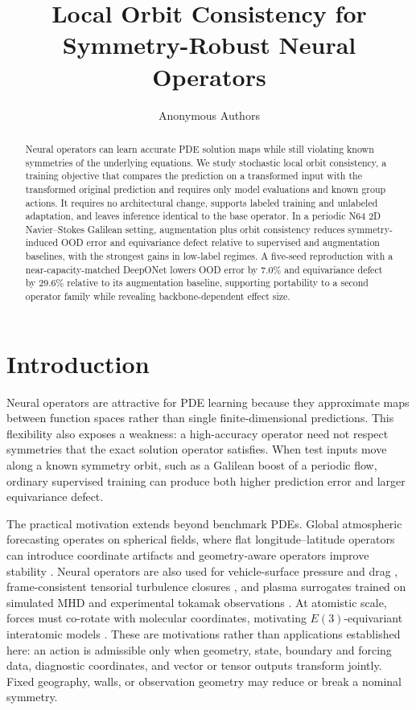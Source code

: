 \documentclass[10pt]{article}
\title{Local Orbit Consistency for Symmetry-Robust Neural Operators}
\author{Anonymous Authors}
\date{}
\begin{document}
\maketitle

\begin{abstract}
Neural operators can learn accurate PDE solution maps while still violating known symmetries of the underlying equations. We study stochastic local orbit consistency, a training objective that compares the prediction on a transformed input with the transformed original prediction and requires only model evaluations and known group actions. It requires no architectural change, supports labeled training and unlabeled adaptation, and leaves inference identical to the base operator. In a periodic N64 2D Navier--Stokes Galilean setting, augmentation plus orbit consistency reduces symmetry-induced OOD error and equivariance defect relative to supervised and augmentation baselines, with the strongest gains in low-label regimes. A five-seed reproduction with a near-capacity-matched DeepONet lowers OOD error by 7.0\% and equivariance defect by 29.6\% relative to its augmentation baseline, supporting portability to a second operator family while revealing backbone-dependent effect size.
\end{abstract}

\section{Introduction}
Neural operators are attractive for PDE learning because they approximate maps between function spaces rather than single finite-dimensional predictions. This flexibility also exposes a weakness: a high-accuracy operator need not respect symmetries that the exact solution operator satisfies. When test inputs move along a known symmetry orbit, such as a Galilean boost of a periodic flow, ordinary supervised training can produce both higher prediction error and larger equivariance defect.

The practical motivation extends beyond benchmark PDEs. Global atmospheric forecasting operates on spherical fields, where flat longitude--latitude operators can introduce coordinate artifacts and geometry-aware operators improve stability \citep{bonev2023sfno}. Neural operators are also used for vehicle-surface pressure and drag \citep{li2023gino}, frame-consistent tensorial turbulence closures \citep{han2023equivariant}, and plasma surrogates trained on simulated MHD and experimental tokamak observations \citep{gopakumar2024plasma}. At atomistic scale, forces must co-rotate with molecular coordinates, motivating \(E(3)\)-equivariant interatomic models \citep{batzner2022nequip}. These are motivations rather than applications established here: an action is admissible only when geometry, state, boundary and forcing data, diagnostic coordinates, and vector or tensor outputs transform jointly. Fixed geography, walls, or observation geometry may reduce or break a nominal symmetry.
\end{document}
